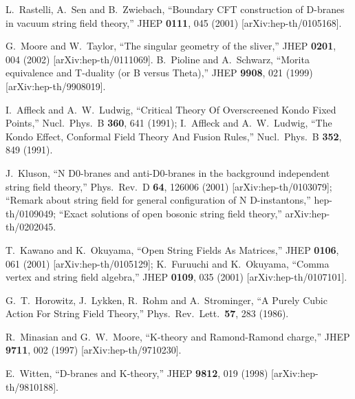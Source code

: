 \documentclass[a4paper,12pt]{article}
\begin{document}
\begin{thebibliography}{999}
L.~Rastelli, A.~Sen and B.~Zwiebach,
``Boundary CFT construction of D-branes in vacuum string field theory,''
JHEP {\bf 0111}, 045 (2001)
[arXiv:hep-th/0105168].

G.~Moore and W.~Taylor,
``The singular geometry of the sliver,''
JHEP {\bf 0201}, 004 (2002)
[arXiv:hep-th/0111069].
B.~Pioline and A.~Schwarz,
``Morita equivalence and T-duality (or B versus Theta),''
JHEP {\bf 9908}, 021 (1999)
[arXiv:hep-th/9908019].



I.~Affleck and A.~W.~Ludwig,
``Critical Theory Of Overscreened Kondo Fixed Points,''
Nucl.\ Phys.\ B {\bf 360}, 641 (1991);
I.~Affleck and A.~W.~Ludwig,
``The Kondo Effect, Conformal Field Theory And Fusion Rules,''
Nucl.\ Phys.\ B {\bf 352}, 849 (1991).






J.~Kluson,
``N D0-branes and anti-D0-branes in the 
background independent string  field theory,''
Phys.\ Rev.\ D {\bf 64}, 126006 (2001)
[arXiv:hep-th/0103079];
``Remark about string field for 
general configuration of N D-instantons,''
hep-th/0109049;
``Exact solutions of open bosonic string field theory,''
arXiv:hep-th/0202045.



T.~Kawano and K.~Okuyama,
``Open String Fields As Matrices,''
JHEP {\bf 0106}, 061 (2001) [arXiv:hep-th/0105129];
K.~Furuuchi and K.~Okuyama,
``Comma vertex and string field algebra,''
JHEP {\bf 0109}, 035 (2001) [arXiv:hep-th/0107101].

G.~T.~Horowitz, J.~Lykken, R.~Rohm and A.~Strominger,
``A Purely Cubic Action For String Field Theory,''
Phys.\ Rev.\ Lett.\  {\bf 57}, 283 (1986).


R.~Minasian and G.~W.~Moore,
``K-theory and Ramond-Ramond charge,''
JHEP {\bf 9711}, 002 (1997)
[arXiv:hep-th/9710230].

E.~Witten,
``D-branes and K-theory,''
JHEP {\bf 9812}, 019 (1998)
[arXiv:hep-th/9810188].


\end{thebibliography}
\end{document}
